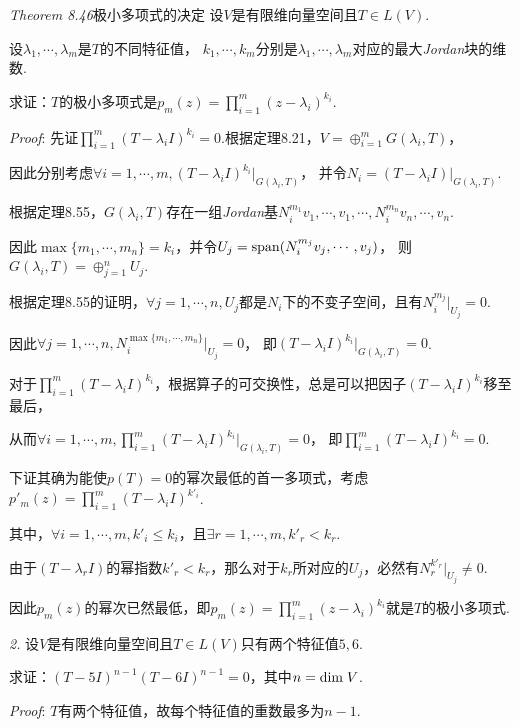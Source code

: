 \textit{Theorem 8.46}{\kaishu 极小多项式的决定}
设\(V\)是有限维向量空间且\(T \in L(V)\).

设\(\lambda_1,\cdots,\lambda_m\)是\(T\)的不同特征值，
\(k_1,\cdots,k_m\)分别是\(\lambda_1,\cdots,\lambda_m\)对应的最大\textit{Jordan}块的维数.

求证：\(T\)的极小多项式是\(p_m(z)=\prod_{i=1}^m (z-\lambda_i)^{k_i}\).

\textit{Proof}:
先证\(\prod_{i=1}^m (T-\lambda_i I)^{k_i}=0\).根据定理8.21，\(V=\oplus_{i=1}^m G(\lambda_i,T)\)，

因此分别考虑\(\forall i=1,\cdots,m,(T-\lambda_i I)^{k_i}|_{G(\lambda_i,T)}\)，
并令\(N_i=(T-\lambda_i I)|_{G(\lambda_i,T)}\).

根据定理8.55，\(G(\lambda_i,T)\)存在一组\textit{Jordan}基\(N_i^{m_1}v_1,\cdots,v_1,\cdots,N_i^{m_n}v_n,\cdots,v_n\).

因此\(\max \{m_1,\cdots,m_n\}=k_i\)，并令\(U_j=\mathrm{span} (N_i^{m_j}v_j,\cdots,v_j)\)，
则\(G(\lambda_i,T)=\oplus_{j=1}^n U_j\).

根据定理8.55的证明，\(\forall j=1,\cdots,n,U_j\)都是\(N_i\)下的不变子空间，且有\(N_i^{m_j}|_{U_j}=0\).

因此\(\forall j=1,\cdots,n,N_i^{\max \{m_1,\cdots,m_n\}}|_{U_j}=0\)，
即\((T-\lambda_i I)^{k_i}|_{G(\lambda_i,T)}=0\).

对于\(\prod_{i=1}^m (T-\lambda_i I)^{k_i}\)，根据算子的可交换性，总是可以把因子\((T-\lambda_i I)^{k_i}\)移至最后，

从而\(\forall i=1,\cdots,m,\prod_{i=1}^m (T-\lambda_i I)^{k_i}|_{G(\lambda_i,T)}=0\)，
即\(\prod_{i=1}^m (T-\lambda_i I)^{k_i}=0\).

下证其确为能使\(p(T)=0\)的幂次最低的首一多项式，考虑\(p'_m(z)=\prod_{i=1}^m (T-\lambda_i I)^{k'_i}\).

其中，\(\forall i=1,\cdots,m,k'_i \leq k_i\)，且\(\exists r=1,\cdots,m,k'_r<k_r\).

由于\((T-\lambda_r I)\)的幂指数\(k'_r<k_r\)，那么对于\(k_r\)所对应的\(U_j\)，必然有\(N_r^{k'_r}|_{U_j} \ne 0\).

因此\(p_m(z)\)的幂次已然最低，即\(p_m(z)=\prod_{i=1}^m (z-\lambda_i)^{k_i}\)就是\(T\)的极小多项式.

\hspace*{\fill}

\textit{2.}
设\(V\)是有限维向量空间且\(T \in L(V)\)只有两个特征值\(5,6\).

求证：\((T-5I)^{n-1}(T-6I)^{n-1}=0\)，其中\(n=\mathrm{dim \;} V\).

\textit{Proof}:
\(T\)有两个特征值，故每个特征值的重数最多为\(n-1\).

